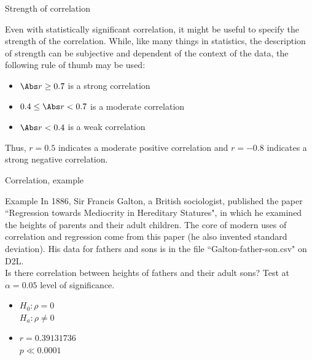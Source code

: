 \documentclass[xcolor=table, aspectratio=169, bigger, handout]{beamer}
\begin{document}
\begin{frame}{Strength of correlation}
\begin{block}{}
Even with statistically significant correlation, it might be useful to specify the strength of the correlation. While, like many things in statistics, the description of strength can be subjective and dependent of the context of the data, the following rule of thumb may be used:
\begin{itemize}
\pause\item $\Abs r \ge 0.7$ is a strong correlation
\pause\item $0.4 \le \Abs r < 0.7$ is a moderate correlation
\pause\item $\Abs r < 0.4$ is a weak correlation
\end{itemize}
\pause Thus, $r=0.5$ indicates a moderate positive correlation and $r=-0.8$ indicates a strong negative correlation.
\end{block}
\end{frame}


\begin{frame}{Correlation, example}
\begin{exampleblock}{Example}
In 1886, Sir Francis Galton, a British sociologist, published the paper ``Regression towards Mediocrity in Hereditary Statures", in which he examined the heights of parents and their adult children. The core of modern uses of correlation and regression come from this paper (he also invented standard deviation). His data for fathers and sons is in the file ``Galton-father-son.csv" on D2L.\\
\medskip
Is there correlation between heights of fathers and their adult sons? Test at $\alpha = 0.05$ level of significance.
\begin{itemize}
\pause\item $H_0: \rho = 0$\\$H_a: \rho \ne 0$ 
\pause\item $r = 0.39131736$ \\ $p \ll 0.0001$
\end{itemize} 
\end{exampleblock}
\end{frame}
\end{document}
